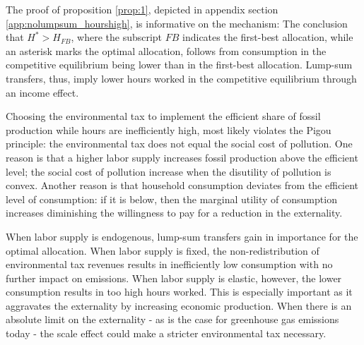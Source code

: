 
 
The proof of proposition \ref{prop:1}, depicted in appendix section \ref{app:nolumpsum_hourshigh}, is informative on the mechanism: The conclusion that $H^*>H_{FB}$, where the subscript $FB$ indicates the first-best allocation, while an asterisk marks the optimal allocation,  follows from consumption in the competitive equilibrium being lower than in the first-best allocation. Lump-sum transfers, thus, imply lower hours worked in the competitive equilibrium through an income effect.


Choosing the environmental tax to implement the efficient share of fossil production while hours are inefficiently high, most likely  violates the Pigou principle: the environmental tax does not equal the social cost of pollution. One reason is that a higher labor supply increases fossil production above the efficient level; the social cost of pollution increase when the disutility of pollution is convex. Another reason is that household consumption deviates from the efficient level of consumption: if it is below, then the marginal utility of consumption increases diminishing the willingness to pay for a reduction in the externality. 

When labor supply is endogenous, lump-sum transfers gain in importance for the optimal allocation. When labor supply is fixed, the non-redistribution of environmental tax revenues results in inefficiently low consumption with no further impact on emissions. When labor supply is elastic, however, the lower consumption results in too high hours worked. This is especially important as it aggravates the externality by increasing economic production. When there is an absolute limit on the externality - as is the case for greenhouse gas emissions today - the scale effect could make a stricter environmental tax necessary. 

